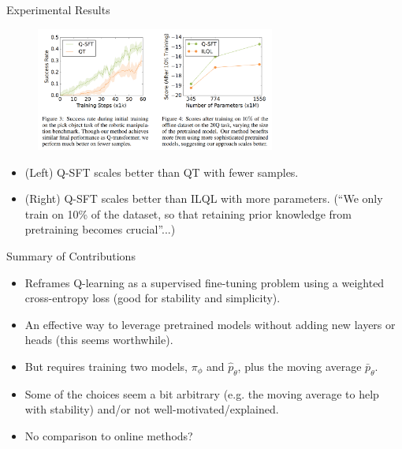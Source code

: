\documentclass[aspectratio=169]{beamer}
\begin{document}
\begin{frame}{Experimental Results}
    \begin{figure}
        \includegraphics[width=0.7\textwidth]{img/Q-SFT eval3.png}
    \end{figure}
    \begin{itemize}
        \item (Left) Q-SFT scales better than QT with fewer samples.
        \item (Right) Q-SFT scales better than ILQL with more parameters. (``We only train on 10\% of the dataset, so that retaining prior knowledge from pretraining becomes crucial''...)
    \end{itemize}
\end{frame}
  
  \begin{frame}{Summary of Contributions}
    \begin{itemize}
      \item Reframes Q-learning as a supervised fine-tuning problem using a weighted cross-entropy loss (good for stability and simplicity).
      \item An effective way to leverage pretrained models without adding new layers or heads (this seems worthwhile).
      \item But requires training two models, $\pi_\phi$ and $\hat{p}_\theta$, plus the moving average $\bar{p}_\theta$.
      \item Some of the choices seem a bit arbitrary (e.g. the moving average to help with stability) and/or not well-motivated/explained.
      \item No comparison to online methods? 
    \end{itemize}
  \end{frame}


\end{document}
